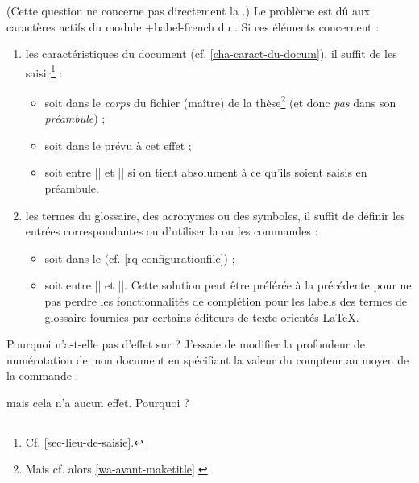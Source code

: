 (Cette question ne concerne pas directement la \yatCl{}.) Le problème
est dû aux caractères actifs du module \package*+{babel-french} du
. Si ces éléments concernent :
\begin{enumerate}
\item les caractéristiques du document (cf. \vref{cha-caract-du-docum}), il
  suffit de les saisir\footnote{Cf. \vref{sec-lieu-de-saisie}.} :
  \begin{itemize}
  \item soit dans le \emph{corps} du fichier (maître) de la thèse\footnote{Mais
      cf. alors \vref{wa-avant-maketitle}.} (et donc \emph{pas} dans son
    \emph{préambule}) ;
  \item soit dans le \File{\characteristicsfile} prévu à cet effet ;
  \item soit entre || et || si on tient
    absolument à ce qu'ils soient saisis en préambule.
  \end{itemize}
\item les termes du glossaire, des acronymes ou des symboles, il suffit de
  définir les entrées correspondantes ou d'utiliser la ou les commandes
   :
  \begin{itemize}
  \item soit dans le \File{\configurationfile}
    (cf. \vref{rq-configurationfile}) ;
  \item soit entre || et ||. Cette solution
    peut être préférée à la précédente pour ne pas perdre les fonctionnalités de
    complétion pour les labels des termes de glossaire fournies par certains
    éditeurs de texte orientés \LaTeX{}.
  \end{itemize}
\end{enumerate}

\begin{dbfaq}{Pourquoi \protect{} n'a-t-elle pas
    d'effet sur \protect{} ?}{}
  J'essaie de modifier la profondeur de numérotation de mon document en
  spécifiant la valeur du compteur  au moyen de la
  commande :
\begin{preamblecode}
\end{preamblecode}
  mais cela n'a aucun effet. Pourquoi ?
\end{dbfaq}

